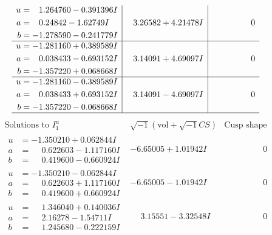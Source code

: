 \documentclass[1p]{elsarticle_modified}
\theoremstyle{definition}
\newcommand{\I}{\sqrt{-1}}
\begin{document}
$$\begin{array}{c|c|c}
\begin{aligned}
u &= \phantom{-}1.264760 - 0.391396 I \\
a &= \phantom{-}0.24842 - 1.62749 I \\
b &= -1.278590 - 0.241779 I\end{aligned}
 & \phantom{-}3.26582 + 4.21478 I & \phantom{-0.000000 } 0 \\ \hline\begin{aligned}
u &= -1.281160 + 0.389589 I \\
a &= \phantom{-}0.038433 - 0.693152 I \\
b &= -1.357220 + 0.068668 I\end{aligned}
 & \phantom{-}3.14091 + 4.69097 I & \phantom{-0.000000 } 0 \\ \hline\begin{aligned}
u &= -1.281160 - 0.389589 I \\
a &= \phantom{-}0.038433 + 0.693152 I \\
b &= -1.357220 - 0.068668 I\end{aligned}
 & \phantom{-}3.14091 - 4.69097 I & \phantom{-0.000000 } 0\\
 \hline 
 \end{array}$$\newpage$$\begin{array}{c|c|c}  
\text{Solutions to }I^u_{1}& \I (\text{vol} + \sqrt{-1}CS) & \text{Cusp shape}\\
 \hline 
\begin{aligned}
u &= -1.350210 + 0.062844 I \\
a &= \phantom{-}0.622603 - 1.117160 I \\
b &= \phantom{-}0.419600 - 0.660924 I\end{aligned}
 & -6.65005 + 1.01942 I & \phantom{-0.000000 } 0 \\ \hline\begin{aligned}
u &= -1.350210 - 0.062844 I \\
a &= \phantom{-}0.622603 + 1.117160 I \\
b &= \phantom{-}0.419600 + 0.660924 I\end{aligned}
 & -6.65005 - 1.01942 I & \phantom{-0.000000 } 0 \\ \hline\begin{aligned}
u &= \phantom{-}1.346040 + 0.140036 I \\
a &= \phantom{-}2.16278 - 1.54711 I \\
b &= \phantom{-}1.245680 - 0.222159 I\end{aligned}
 & \phantom{-}3.15551 - 3.32548 I & \phantom{-0.000000 } 0 \\ \hline\begin{aligned}

\end{aligned}
\end{array}$$
\end{document}
